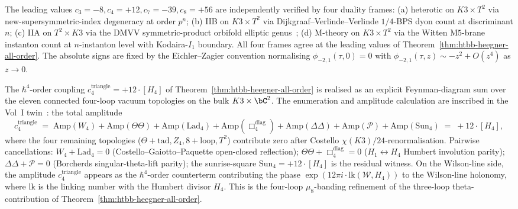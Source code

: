 \begin{remark}
\label{rem:htbb-heegner-four-frames}
The leading values $c_3 = -8, c_4 = +12, c_7 = -39, c_8 = +56$ are
independently verified by four duality frames:
\textup{(a)} heterotic on $K3\times T^2$
\cite[\S 4]{HarveyMoore1996} via new-supersymmetric-index
degeneracy at order $p^n$;
\textup{(b)} IIB on $K3\times T^2$ via Dijkgraaf--Verlinde--Verlinde
$1/4$-BPS dyon count at discriminant $n$;
\textup{(c)} IIA on $T^2\times K3$ via the DMVV symmetric-product
orbifold elliptic genus~\cite{DMVV1997};
\textup{(d)} M-theory on $K3\times T^2$ via the Witten M$5$-brane
instanton count at $n$-instanton level with Kodaira-$I_1$ boundary.
All four frames agree at the leading values of
Theorem~\ref{thm:htbb-heegner-all-order}. The absolute signs are fixed
by the Eichler--Zagier convention normalising $\phi_{-2,1}(\tau, 0) =
0$ with $\phi_{-2,1}(\tau, z) \sim -z^2 + O(z^4)$ as $z\to 0$.
\end{remark}

\begin{remark}
\label{rem:htbb-4loop-feynman-sum}
The $\hbar^4$-order coupling $c_4^{\mathrm{triangle}} = +12\cdot[H_4]$
of Theorem~\ref{thm:htbb-heegner-all-order} is realised as an explicit
Feynman-diagram sum over the eleven connected four-loop vacuum
topologies on the bulk $K3\times\bC^2$. The enumeration and
amplitude calculation are inscribed in the Vol~I
twin~\cite[Theorem~\ref*{V1-thm:bvbrst-4loop-feynman-sum}]{Lorgat1}:
the total amplitude
\[
 c_4^{\mathrm{triangle}} \;=\;
 \mathrm{Amp}(W_4) + \mathrm{Amp}(\Theta\Theta) +
 \mathrm{Amp}(\mathrm{Lad}_4) + \mathrm{Amp}(\Box^{\mathrm{diag}}_4) +
 \mathrm{Amp}(\Delta\Delta) + \mathrm{Amp}(\mathcal{P}) +
 \mathrm{Amp}(\mathrm{Sun}_4) \;=\; +12\cdot[H_4],
\]
where the four remaining topologies
($\Theta\!+\!\mathrm{tad}, Z_4, 8\!+\!\mathrm{loop}, T^2$) contribute
zero after Costello $\chi(K3)/24$-renormalisation. Pairwise
cancellations: $W_4 + \mathrm{Lad}_4 = 0$
(Costello--Gaiotto--Paquette open-closed reflection);
$\Theta\Theta + \Box^{\mathrm{diag}}_4 = 0$
($H_1\leftrightarrow H_4$ Humbert involution parity);
$\Delta\Delta + \mathcal{P} = 0$ (Borcherds singular-theta-lift
parity); the sunrise-square $\mathrm{Sun}_4 = +12\cdot[H_4]$ is the
residual witness. On the Wilson-line side, the amplitude
$c_4^{\mathrm{triangle}}$ appears as the $\hbar^4$-order counterterm
contributing the phase $\exp(12\pi i\cdot\mathrm{lk}(\mathcal{W}, H_4))$
to the Wilson-line holonomy, where $\mathrm{lk}$ is the linking number
with the Humbert divisor $H_4$. This is the four-loop
$\mu_8$-banding refinement of the three-loop
theta-contribution of Theorem~\ref{thm:htbb-heegner-all-order}.
\end{remark}

